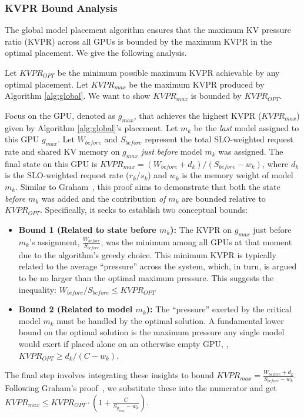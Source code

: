 \subsubsection{KVPR Bound Analysis}
\label{ap:kvpr-bound}

The global model placement algorithm ensures that the maximum KV pressure ratio (KVPR) across all GPUs is bounded by the maximum KVPR in the optimal placement. We give the following analysis.

Let $KVPR_{OPT}$ be the minimum possible maximum KVPR achievable by any optimal placement. Let $KVPR_{max}$ be the maximum KVPR produced by Algorithm \ref{alg:global}. We want to show $KVPR_{max}$ is bounded by $KVPR_{OPT}$.

 Focus on the GPU, denoted as $g_{max}$, that achieves the highest KVPR ($KVPR_{max}$) given by Algorithm \ref{alg:global}'s placement. 
Let $m_k$ be the \emph{last} model assigned to this GPU $g_{max}$. Let $W_{before}$ and $S_{before}$ represent the total SLO-weighted request rate and shared KV memory on $g_{max}$ \emph{just before} model $m_k$ was assigned. The final state on this GPU is $KVPR_{max} = (W_{before} +d_k) / (S_{before} - w_k)$, where $d_k$ is the SLO-weighted request rate ($r_k/s_k$) and $w_k$ is the memory weight of model $m_k$.
Similar to Graham~\cite{graham1969bounds}, this proof aims to demonstrate that both the state \emph{before} $m_k$ was added and the contribution \emph{of} $m_k$ are bounded relative to $KVPR_{OPT}$. Specifically, it seeks to establish two conceptual bounds:
\begin{itemize}
    \item \textbf{Bound 1 (Related to state before $m_k$):} The KVPR on $g_{max}$ just before $m_k$'s assignment, $\frac{W_{before}}{S_{before}}$, was the minimum among all GPUs at that moment due to the algorithm's greedy choice. This minimum KVPR is typically related to the average ``pressure'' across the system, which, in turn, is argued to be no larger than the optimal maximum pressure. This suggests the inequality: $W_{before} / S_{before} \le KVPR_{OPT}$
    \item \textbf{Bound 2 (Related to model $m_k$):} The ``pressure'' exerted by the critical model $m_k$ must be handled by the optimal solution. A fundamental lower bound on the optimal solution is the maximum pressure any single model would exert if placed alone on an otherwise empty GPU, \ie, $KVPR_{OPT} \ge d_k/(C-w_k)$.
\end{itemize}
The final step involves integrating these insights to bound $KVPR_{max} = \frac{W_{before} + d_k}{S_{before} - w_k}$. 
Following Graham's proof~\cite{graham1969bounds}, we substitute these into the numerator and get $KVPR_{max}\le KVPR_{OPT}\cdot (1+\frac{C}{S_{g_{max}}-w_k})$.

